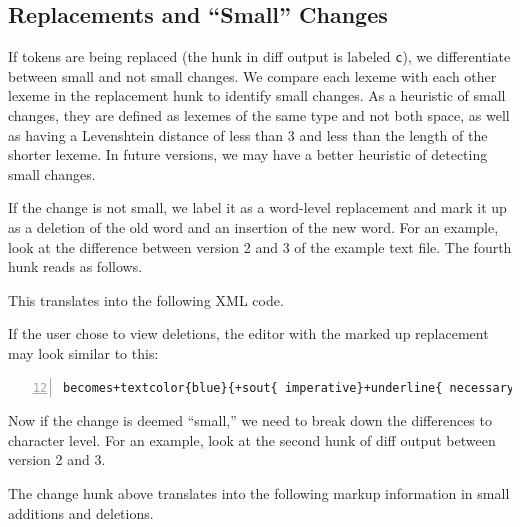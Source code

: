 \subsection{Replacements and ``Small'' Changes}

If tokens are being replaced (the hunk in diff output is labeled \texttt{c}), we differentiate between small and not small changes.  We compare each lexeme with each other lexeme in the replacement hunk to identify small changes.  As a heuristic of small changes, they are defined as lexemes of the same type and not both space, as well as having a Levenshtein distance of less than 3 and less than the length of the shorter lexeme. In future versions, we may have a better heuristic of detecting small changes. %

If the change is not small, we label it as a word-level replacement and mark it up as a deletion of the old word and an insertion of the new word.  For an example, look at the difference between version 2 and 3 of the example text file.  The fourth hunk reads as follows.


This translates into the following XML code.


If the user chose to view deletions, the editor with the marked up replacement may look similar to this:

\begin{Verbatim}[frame=lines,label={Markup of whole word change blocks},numbers=left,firstnumber=12,showspaces=true,commandchars=+\{\}]
becomes+textcolor{blue}{+sout{ imperative}+underline{ necessary }}for
\end{Verbatim}

Now if the change is deemed ``small,'' we need to break down the differences to character level.  For an example, look at the second hunk of diff output between version 2 and 3.


The change hunk above translates into the following markup information in small additions and deletions.  

